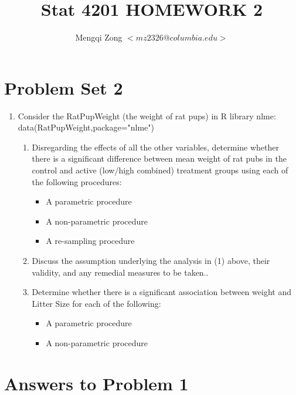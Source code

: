 \documentclass[12pt]{article}
\title{Stat 4201 HOMEWORK 2}
\author{Mengqi Zong $<mz2326@columbia.edu>$}
\begin{document}
\maketitle

\section{Problem Set 2}

\begin{enumerate}
\item Consider the RatPupWeight (the weight of rat pups) in R library nlme:\\
data(RatPupWeight,package="nlme")

\begin{enumerate}
\item Disregarding the effects of all the other variables, determine
  whether there is a significant difference between mean weight of rat
  pubs in the control and active (low/high combined) treatment groups
  using each of the following procedures:
  
  \begin{itemize}
    \item A parametric procedure
    \item A non-parametric procedure
    \item A re-sampling procedure
  \end{itemize}

\item Discuss the assumption underlying the analysis in (1) above,
  their validity, and any remedial measures to be taken..
\item Determine whether there is a significant association between
  weight and Litter Size for each of the following:

  \begin{itemize}
    \item A parametric procedure
    \item A non-parametric procedure
  \end{itemize}

\end{enumerate}
\end{enumerate}

\section{Answers to Problem 1}
\end{document}
